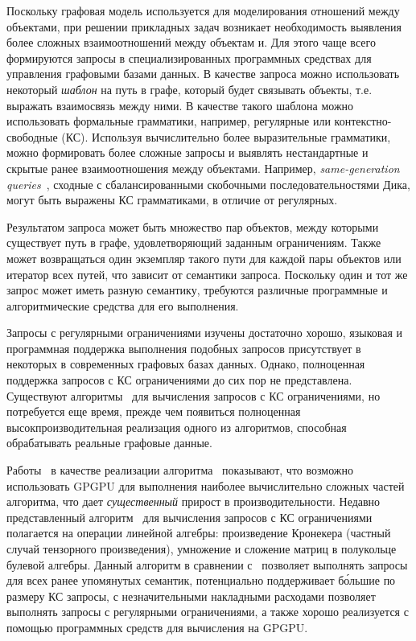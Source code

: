 \documentclass[14pt]{matmex-diploma-custom}
\begin{document}
Поскольку графовая модель используется для моделирования отношений между объектами, при решении прикладных задач возникает необходимость выявления более сложных взаимоотношений между объектам и. Для этого чаще всего формируются запросы в специализированных программных средствах для управления графовыми базами данных. В качестве запроса можно использовать некоторый \textit{шаблон} на путь в графе, который будет связывать объекты, т.е. выражать взаимосвязь между ними. В качестве такого шаблона можно использовать формальные грамматики, например, регулярные или контекстно-свободные (КС). Используя вычислительно более выразительные грамматики, можно формировать более сложные запросы и выявлять нестандартные и скрытые ранее взаимоотношения между объектами. Например, \textit{same-generation queries}~\cite{inbook:databases_intro}, сходные с сбалансированными скобочными последовательностями Дика, могут быть выражены КС грамматиками, в отличие от регулярных.

Результатом запроса может быть множество пар объектов, между которыми существует путь в графе, удовлетворяющий заданным ограничениям. Также может возвращаться один экземпляр такого пути для каждой пары объектов или итератор всех путей, что зависит от семантики запроса. Поскольку один и тот же запрос может иметь разную семантику, требуются различные программные и алгоритмические средства для его выполнения.  

Запросы с регулярными ограничениями изучены достаточно хорошо, языковая и программная поддержка выполнения подобных запросов присутствует в некоторых в современных графовых базах данных. Однако, полноценная поддержка запросов с КС ограничениями до сих пор не представлена. Существуют алгоритмы~\cite{DBLP:journals/corr/ZhangFWR15, article:hellings_cfpq, inproceedings:matrix_cfpq, inbook:kronecker_cfpq_adbis, article:cfpq_go_for_rdf} для вычисления запросов с КС ограничениями, но потребуется еще время, прежде чем появиться полноценная высокпроизводительная реализация одного из алгоритмов, способная обрабатывать реальные графовые данные.

Работы~\cite{inproceedings:cfpq_matrix_evaluation, inproceedings:cfqp_matrix_with_single_source} в качестве реализации алгоритма~\cite{inproceedings:matrix_cfpq} показывают, что возможно использовать GPGPU для выполнения наиболее вычислительно сложных частей алгоритма, что дает \textit{существенный} прирост в производительности. Недавно представленный алгоритм~\cite{inbook:kronecker_cfpq_adbis} для вычисления запросов с КС ограничениями полагается на операции линейной алгебры: произведение Кронекера (частный случай тензорного произведения), умножение и сложение матриц в полукольце булевой алгебры. Данный алгоритм в сравнении с~\cite{inproceedings:matrix_cfpq} позволяет выполнять запросы для всех ранее упомянутых семантик, потенциально поддерживает б\'ольшие по размеру КС запросы, с незначительными накладными расходами позволяет выполнять запросы с регулярными ограничениями, а также хорошо реализуется с помощью программных средств для вычисления на GPGPU.
\end{document}
